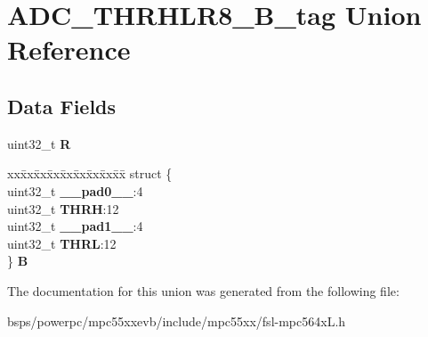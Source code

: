 \hypertarget{unionADC__THRHLR8__32B__tag}{}\section{A\+D\+C\+\_\+\+T\+H\+R\+H\+L\+R8\+\_\+B\+\_\+tag Union Reference}
\label{unionADC__THRHLR8__32B__tag}
\subsection*{Data Fields}
\begin{DoxyCompactItemize}
\item 
\mbox{\label{unionADC__THRHLR8__32B__tag_a7ecdd6cc9e8214c81c974155a00ebbc3}} 
uint32\+\_\+t {\bfseries R}
\item 
\mbox{\label{unionADC__THRHLR8__32B__tag_a59434636b58109cb27c74339477bca5e}} 
\begin{tabbing}
xx\=xx\=xx\=xx\=xx\=xx\=xx\=xx\=xx\=\kill
struct \{\\
\>uint32\_t {\bfseries \_\_pad0\_\_}:4\\
\>uint32\_t {\bfseries THRH}:12\\
\>uint32\_t {\bfseries \_\_pad1\_\_}:4\\
\>uint32\_t {\bfseries THRL}:12\\
\} {\bfseries B}\\

\end{tabbing}\end{DoxyCompactItemize}


The documentation for this union was generated from the following file\+:\begin{DoxyCompactItemize}
\item 
bsps/powerpc/mpc55xxevb/include/mpc55xx/fsl-\/mpc564x\+L.\+h\end{DoxyCompactItemize}
